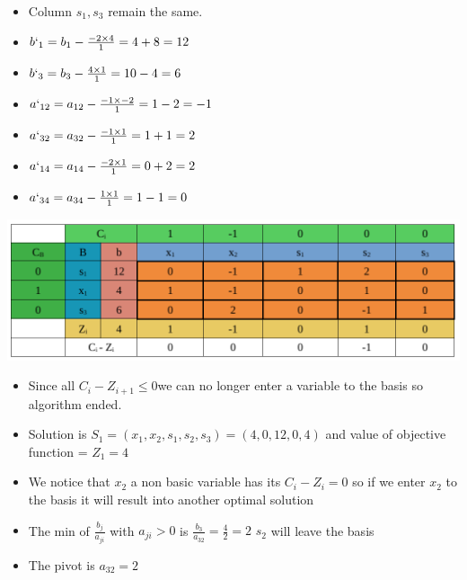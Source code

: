 \vspace{0.25cm}
\begin{itemize}
 \item Column \(s_1 , s_3\) remain the same.
 \item \(b`_{1} = b_{1} - \frac{-2\times4}{1} = 4 + 8  = 12\)
 \item \(b`_{3} = b_{3} - \frac{4\times1}{1} = 10 - 4  = 6\)
 \item \(a`_{12} = a_{12} - \frac{-1\times-2}{1} = 1 - 2  = -1\)
 \item \(a`_{32} = a_{32} - \frac{-1\times1}{1} = 1 + 1  = 2\)
 \item \(a`_{14} = a_{14} - \frac{-2\times1}{1} = 0 + 2  = 2\)
 \item \(a`_{34} = a_{34} - \frac{1\times1}{1} = 1 - 1  = 0\)
\end{itemize}

\vspace{0.25cm}




\begin{center}
    \includegraphics{Chapters/Simplexe/EX/EX4/ex4.3.pdf}
\end{center}

\vspace{0.25cm}

\begin{itemize}
    \item Since all \hspace{0.2cm}\(C_i - Z_{i+1} \leq 0\)\hspace{0.2cm}we can no longer enter a variable to the basis so algorithm ended.
    \item Solution is \(S_1 = (x_1,x_2,s_1,s_2,s_3) = (4,0,12,0,4)\) and value of objective function = \(Z_1 = 4\)
    \item We notice that \(x_2\) a non basic variable has its \(C_i - Z_i = 0\) so if we enter \(x_2\) to the basis it will result into another
        optimal solution
   \item The min of \hspace{0.1cm}\(\frac{b_j}{a_{ji}}\)\hspace{0.1cm} with \(a_{ji} > 0\)\hspace{0.1cm} is \hspace{0.1cm} \(\frac{b_3}{a_{32}} = \frac{4}{2} = 2\)\hspace{0.35cm} \(s_2\)
will leave the basis
   \item The pivot is \(a_{32} = 2\)
 
\end{itemize}

